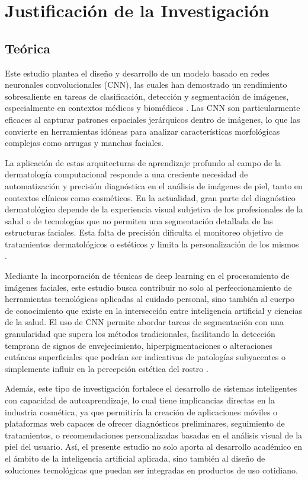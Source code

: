 \section{Justificación de la Investigación}

\subsection{Teórica}

Este estudio plantea el diseño y desarrollo de un modelo basado en redes neuronales convolucionales (CNN), las cuales han demostrado un rendimiento sobresaliente en tareas de clasificación, detección y segmentación de imágenes, especialmente en contextos médicos y biomédicos \parencite{esteva2017}. Las CNN son particularmente eficaces al capturar patrones espaciales jerárquicos dentro de imágenes, lo que las convierte en herramientas idóneas para analizar características morfológicas complejas como arrugas y manchas faciales.

La aplicación de estas arquitecturas de aprendizaje profundo al campo de la dermatología computacional responde a una creciente necesidad de automatización y precisión diagnóstica en el análisis de imágenes de piel, tanto en contextos clínicos como cosméticos. En la actualidad, gran parte del diagnóstico dermatológico depende de la experiencia visual subjetiva de los profesionales de la salud o de tecnologías que no permiten una segmentación detallada de las estructuras faciales. Esta falta de precisión dificulta el monitoreo objetivo de tratamientos dermatológicos o estéticos y limita la personalización de los mismos \parencite{lee2020}.

Mediante la incorporación de técnicas de deep learning en el procesamiento de imágenes faciales, este estudio busca contribuir no solo al perfeccionamiento de herramientas tecnológicas aplicadas al cuidado personal, sino también al cuerpo de conocimiento que existe en la intersección entre inteligencia artificial y ciencias de la salud. El uso de CNN permite abordar tareas de segmentación con una granularidad que supera los métodos tradicionales, facilitando la detección temprana de signos de envejecimiento, hiperpigmentaciones o alteraciones cutáneas superficiales que podrían ser indicativas de patologías subyacentes o simplemente influir en la percepción estética del rostro \parencite{phillips2020, gao2018}.

Además, este tipo de investigación fortalece el desarrollo de sistemas inteligentes con capacidad de autoaprendizaje, lo cual tiene implicancias directas en la industria cosmética, ya que permitiría la creación de aplicaciones móviles o plataformas web capaces de ofrecer diagnósticos preliminares, seguimiento de tratamientos, o recomendaciones personalizadas basadas en el análisis visual de la piel del usuario. Así, el presente estudio no solo aporta al desarrollo académico en el ámbito de la inteligencia artificial aplicada, sino también al diseño de soluciones tecnológicas que puedan ser integradas en productos de uso cotidiano.

